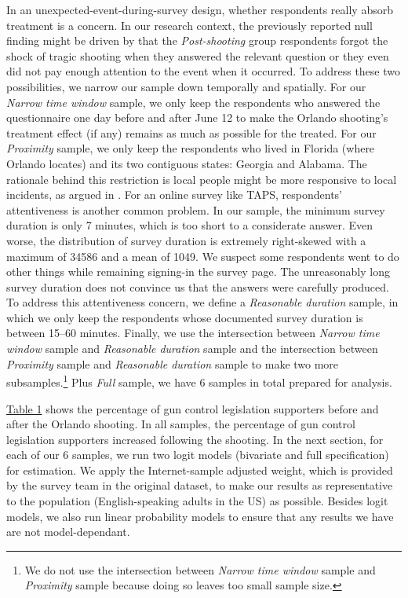 \documentclass[11pt]{article}
\begin{document}
In an unexpected-event-during-survey design, whether respondents really absorb treatment is a concern. In our research context, the previously reported null finding might be driven by that the \emph{Post-shooting} group respondents forgot the shock of tragic shooting when they answered the relevant question or they even did not pay enough attention to the event when it occurred. To address these two possibilities, we narrow our sample down temporally and spatially. For our \emph{Narrow time window} sample, we only keep the respondents who answered the questionnaire one day before and after June 12 to make the Orlando shooting's treatment effect (if any) remains as much as possible for the treated. For our \emph{Proximity} sample, we only keep the respondents who lived in Florida (where Orlando locates) and its two contiguous states: Georgia and Alabama. The rationale behind this restriction is local people might be more responsive to local incidents, as argued in \textcite{newman2019mass-shootings-}. For an online survey like TAPS, respondents' attentiveness is another common problem. In our sample, the minimum survey duration is only 7 minutes, which is too short to a considerate answer. Even worse, the distribution of survey duration is extremely right-skewed with a maximum of 34586 and a mean of 1049. We suspect some respondents went to do other things while remaining signing-in the survey page. The unreasonably long survey duration does not convince us that the answers were carefully produced. To address this attentiveness concern, we define a \emph{Reasonable duration} sample, in which we only keep the respondents whose documented survey duration is between 15--60 minutes. Finally, we use the intersection between \emph{Narrow time window} sample and \emph{Reasonable duration} sample and the intersection between \emph{Proximity} sample and \emph{Reasonable duration} sample to make two more subsamples.\footnote{We do not use the intersection between \emph{Narrow time window} sample and \emph{Proximity} sample because doing so leaves too small sample size.} Plus \emph{Full} sample, we have 6 samples in total prepared for analysis.

\hyperref[tab1]{Table 1} shows the percentage of gun control legislation supporters before and after the Orlando shooting. In all samples, the percentage of gun control legislation supporters increased following the shooting. In the next section, for each of our 6 samples, we run two logit models (bivariate and full specification) for estimation. We apply the Internet-sample adjusted weight, which is provided by the survey team in the original dataset, to make our results as representative to the population (English-speaking adults in the US) as possible. Besides logit models, we also run linear probability models to ensure that any results we have are not model-dependant.

\end{document}
